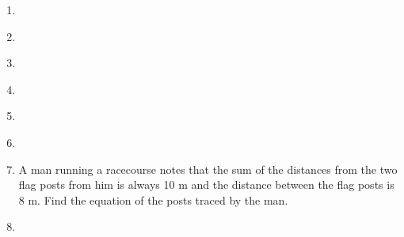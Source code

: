 \begin{enumerate}[label=\thesection.\arabic*,ref=\thesection.\theenumi]

\item 
\item 
\label{chapters/11/11/5/2}

\item 
\item 
\label{chapters/11/11/5/4}

\item 
\item 
\label{chapters/11/11/5/6}

\item A man running a racecourse notes that the sum of the distances from the two flag posts from him is always 10 m and the distance between the flag posts is 8 m. Find the equation of the posts traced by the man. 
\label{chapters/11/11/5/7}

\item 
\label{chapters/11/11/5/8}


\end{enumerate}
